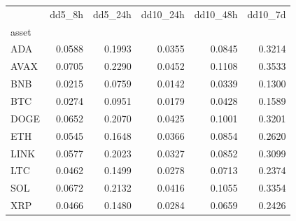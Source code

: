 \begin{tabular}{lrrrrr}
\toprule
 & dd5_8h & dd5_24h & dd10_24h & dd10_48h & dd10_7d \\
asset &  &  &  &  &  \\
\midrule
ADA & 0.0588 & 0.1993 & 0.0355 & 0.0845 & 0.3214 \\
AVAX & 0.0705 & 0.2290 & 0.0452 & 0.1108 & 0.3533 \\
BNB & 0.0215 & 0.0759 & 0.0142 & 0.0339 & 0.1300 \\
BTC & 0.0274 & 0.0951 & 0.0179 & 0.0428 & 0.1589 \\
DOGE & 0.0652 & 0.2070 & 0.0425 & 0.1001 & 0.3201 \\
ETH & 0.0545 & 0.1648 & 0.0366 & 0.0854 & 0.2620 \\
LINK & 0.0577 & 0.2023 & 0.0327 & 0.0852 & 0.3099 \\
LTC & 0.0462 & 0.1499 & 0.0278 & 0.0713 & 0.2374 \\
SOL & 0.0672 & 0.2132 & 0.0416 & 0.1055 & 0.3354 \\
XRP & 0.0466 & 0.1480 & 0.0284 & 0.0659 & 0.2426 \\
\bottomrule
\end{tabular}
